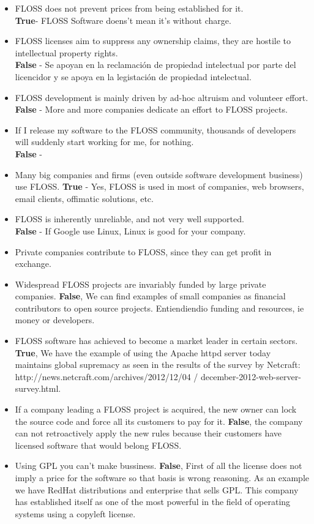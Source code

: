 \documentclass[11pt]{scrartcl}
\begin{document}
\begin{itemize}
    \item FLOSS does not prevent prices from being established for it.\\
        \textbf{True}- FLOSS Software doens't mean it's without charge.
    \item FLOSS licenses aim to suppress any ownership claims, they are hostile to intellectual property rights.\\
        \textbf{False} - Se apoyan en la reclamación de propiedad intelectual por parte del licencidor y se apoya en la legistación de propiedad intelectual.
    \item FLOSS development is mainly driven by ad-hoc altruism and volunteer effort.
        \textbf{False} - More and more companies dedicate an effort to FLOSS projects.
    \item If I release my software to the FLOSS community, thousands of developers will suddenly start working for me, for nothing.\\
        \textbf{False} - 
    \item Many big companies and firms (even outside software development business) use FLOSS.
        \textbf{True} - Yes, FLOSS is used in most of companies, web browsers, email clients, offimatic solutions, etc.
    \item FLOSS is inherently unreliable, and not very well supported.\\
        \textbf{False} - If Google use Linux, Linux is good for your company.
    \item Private companies contribute to FLOSS, since they can get profit in exchange.\\
    \item Widespread FLOSS projects are invariably funded by large private companies. \textbf{False}, We can find examples of small companies as financial contributors to open source projects. Entiendiendio funding and resources, ie money or developers.
    \item FLOSS software has achieved to become a market leader in certain sectors. \textbf{True}, We have the example of using the Apache httpd server today maintains global supremacy as seen in the results of the survey by Netcraft: http://news.netcraft.com/archives/2012/12/04 / december-2012-web-server-survey.html.
    \item If a company leading a FLOSS project is acquired, the new owner can lock the source code and force all its customers to pay for it. \textbf{False}, the company can not retroactively apply the new rules because their customers have licensed software that would belong FLOSS.
    \item Using GPL you can't make bussiness. \textbf{False}, First of all the license does not imply a price for the software so that basis is wrong reasoning. As an example we have RedHat distributions and enterprise that sells GPL. This company has established itself as one of the most powerful in the field of operating systems using a copyleft license. 
\end{itemize}
\end{document}
